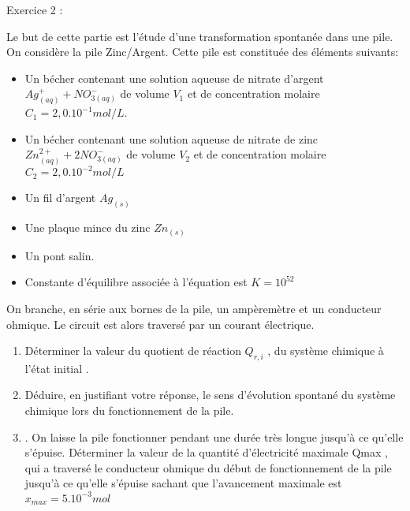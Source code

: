 \documentclass[12pt, french]{article}
\begin{document}
\begin{Box2}{Exercice 2 :}

Le but de cette partie est l’étude d'une transformation spontanée dans une pile.
On considère la pile Zinc/Argent. Cette pile est constituée des éléments suivants:
\begin{itemize}
	\item Un bécher contenant une solution aqueuse de nitrate d'argent $Ag^+_{(aq)} + NO^-_{3(aq)}$ de volume $V_1$
		et de concentration molaire $C_1 = 2,0.10^{-1} mol/L$.


\item  Un bécher contenant une solution aqueuse de nitrate de zinc $Zn^{2+}_{(aq)} + 2NO^-_{3(aq)}$ de volume $V_2$ et
	de concentration molaire $C_2 = 2,0.10^{-2} mol/L$

\item  Un fil d'argent $Ag_{(s)}$

\item Une plaque mince du zinc $Zn_{(s)}$

\item  Un pont salin.

\item Constante d’équilibre associée à l’équation  est $K = 10^{52}$

\end{itemize}

On branche, en série aux bornes de la pile, un ampèremètre et un conducteur ohmique. Le circuit est
alors traversé par un courant électrique.

\begin{enumerate}
	\item Déterminer la valeur du quotient de réaction $Q_{r,i}$
, du système chimique à l'état initial .

\item  Déduire, en justifiant votre réponse, le sens d'évolution spontané du système chimique lors du
fonctionnement de la pile. 
\item . On laisse la pile fonctionner pendant une durée très longue jusqu'à ce qu'elle s'épuise.
Déterminer la valeur de la quantité d’électricité maximale Qmax
, qui a traversé le conducteur ohmique
du début de fonctionnement de la pile jusqu'à ce qu'elle s'épuise sachant que l’avancement maximale
est $x_{max} = 5.10^{-3}mol$
\end{enumerate}

\end{Box2}
\end{document}
